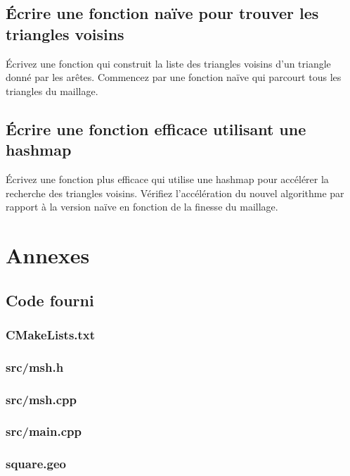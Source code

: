 \documentclass[a4paper,12pt]{article}
\begin{document}
\subsection{Écrire une fonction naïve pour trouver les triangles voisins}

Écrivez une fonction qui construit la liste des triangles voisins d'un triangle donné par les arêtes. Commencez par une fonction naïve qui parcourt tous les triangles du maillage.

\subsection{Écrire une fonction efficace utilisant une hashmap}

Écrivez une fonction plus efficace qui utilise une hashmap pour accélérer la recherche des triangles voisins. Vérifiez l'accélération du nouvel algorithme par rapport à la version naïve en fonction de la finesse du maillage.

\section{Annexes}

\subsection{Code fourni}

\subsubsection{CMakeLists.txt}


\subsubsection{src/msh.h}


\subsubsection{src/msh.cpp}


\subsubsection{src/main.cpp}


\subsubsection{square.geo}

\end{document}
